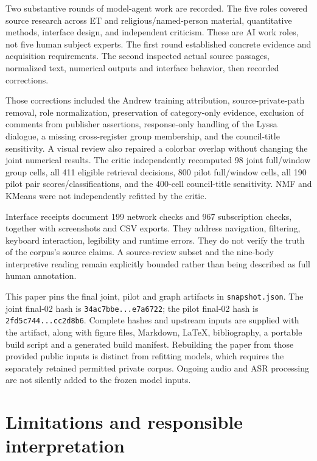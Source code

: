 \documentclass[
  11pt,
]{article}
\begin{document}
Two substantive rounds of model-agent work are recorded. The five roles
covered source research across ET and religious/named-person material,
quantitative methods, interface design, and independent criticism. These
are AI work roles, not five human subject experts. The first round
established concrete evidence and acquisition requirements. The second
inspected actual source passages, normalized text, numerical outputs and
interface behavior, then recorded corrections.

Those corrections included the Andrew training attribution,
source-private-path removal, role normalization, preservation of
category-only evidence, exclusion of comments from publisher assertions,
response-only handling of the Lyssa dialogue, a missing cross-register
group membership, and the council-title sensitivity. A visual review
also repaired a colorbar overlap without changing the joint numerical
results. The critic independently recomputed 98 joint full/window group
cells, all 411 eligible retrieval decisions, 800 pilot full/window
cells, all 190 pilot pair scores/classifications, and the 400-cell
council-title sensitivity. NMF and KMeans were not independently
refitted by the critic.

Interface receipts document 199 network checks and 967 subscription
checks, together with screenshots and CSV exports. They address
navigation, filtering, keyboard interaction, legibility and runtime
errors. They do not verify the truth of the corpus's source claims. A
source-review subset and the nine-body interpretive reading remain
explicitly bounded rather than being described as full human annotation.

This paper pins the final joint, pilot and graph artifacts in
\texttt{snapshot.json}. The joint final-02 hash is
\texttt{34ac7bbe...e7a6722}; the pilot final-02 hash is
\texttt{2fd5c744...cc2d8b6}. Complete hashes and upstream inputs are
supplied with the artifact, along with figure files, Markdown, LaTeX,
bibliography, a portable build script and a generated build manifest.
Rebuilding the paper from those provided public inputs is distinct from
refitting models, which requires the separately retained permitted
private corpus. Ongoing audio and ASR processing are not silently added
to the frozen model inputs.

\FloatBarrier

\section{Limitations and responsible
interpretation}\label{limitations-and-responsible-interpretation}
\end{document}
